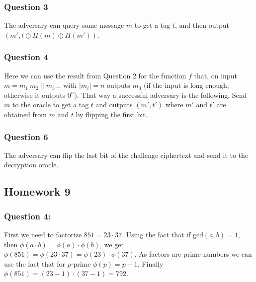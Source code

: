 \documentclass{article}
\numberwithin{defn}{section}
\numberwithin{equation}{section}
\begin{document}
	\subsubsection*{Question 3}
	The adversary can query some message $m$ to get a tag $t$, and then output $(m', t\oplus H(m)\oplus H(m'))$.
	
	\subsubsection*{Question 4}
	Here we can use the result from Question 2 for the function $f$ that, on input $m=m_1\ m_2\|m_3...$ with $|m_i|=n$ outputs $m_3$ (if the input is long enough, otherwise it outputs $0^n$). That way a successful adversary is the following. Send $m$ to the oracle to get a tag $t$ and outputs $(m', t')$ where $m'$ and $t'$ are obtained from $m$ and $t$ by flipping the first bit.
	
	\subsubsection*{Question 6}
	
	The adversary can flip the last bit of the challenge ciphertext and send it to the decryption oracle.
	
	
\subsection*{Homework 9}


\subsubsection*{Question 4:} 
First we need to factorize $851=23\cdot 37$. Using the fact that if $\text{gcd}(a,b)=1$, then $\phi(a\cdot b)=\phi(a)\cdot\phi(b)$, we get $\phi(851)=\phi(23\cdot 37)=\phi(23)\cdot\phi( 37)$. As factors are prime numbers we can use the fact that for $p$-prime $\phi(p)=p-1$. Finally $\phi(851)=(23-1)\cdot(37-1)=792$.
\end{document}
